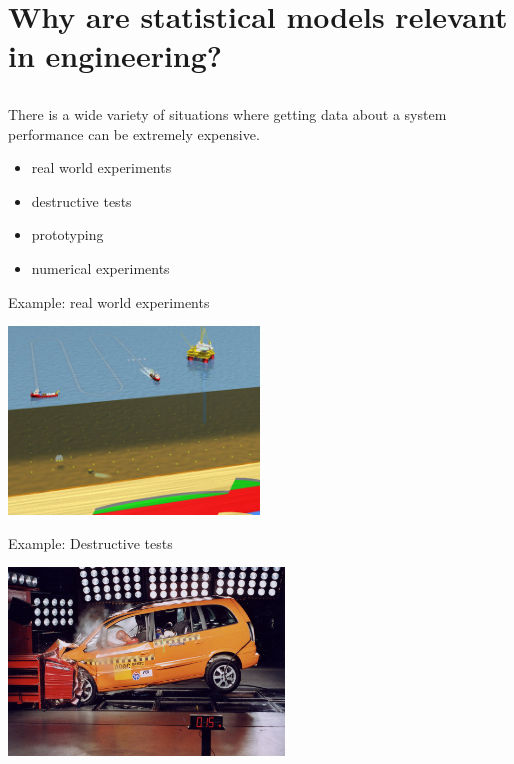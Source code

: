 \section[Context]{Why are statistical models relevant in engineering?}
\subsection{}

\begin{frame}{}
There is a wide variety of situations where getting data about a system performance can be extremely expensive.
\begin{itemize}
	\item real world experiments
	\item destructive tests
	\item prototyping
	\item numerical experiments
\end{itemize}
\end{frame}

\begin{frame}{}
\begin{exampleblock}{Example: real world experiments}
\begin{center}
\includegraphics[height=5cm]{1_stat_models/figures/drilling}
\end{center}
\end{exampleblock}
\end{frame}

\begin{frame}{}
\begin{exampleblock}{Example: Destructive tests}
\begin{center}
\includegraphics[height=5cm]{1_stat_models/figures/crash-test}
\end{center}
\end{exampleblock}
\end{frame}

